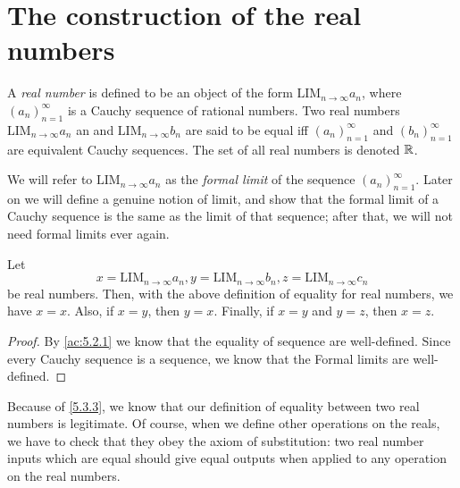 \section{The construction of the real numbers}\label{sec:5.3}

\begin{defn}\label{5.3.1}
  A \emph{real number} is defined to be an object of the form \(\text{LIM}_{n \to \infty} a_n\), where \((a_n)_{n = 1}^{\infty}\) is a Cauchy sequence of rational numbers.
  Two real numbers \(\text{LIM}_{n \to \infty} a_n\) an and \(\text{LIM}_{n \to \infty} b_n\) are said to be equal iff \((a_n)_{n = 1}^{\infty}\) and \((b_n)_{n = 1}^{\infty}\) are equivalent Cauchy sequences.
  The set of all real numbers is denoted \(\mathbb{R}\).
\end{defn}

\begin{note}
  We will refer to \(\text{LIM}_{n \to \infty} a_n\) as the \emph{formal limit} of the sequence \((a_n)_{n = 1}^{\infty}\).
  Later on we will define a genuine notion of limit, and show that the formal limit of a Cauchy sequence is the same as the limit of that sequence;
  after that, we will not need formal limits ever again.
\end{note}

\setcounter{thm}{2}
\begin{prop}\label{5.3.3}
  Let
  \[
    x = \text{LIM}_{n \to \infty} a_n, y = \text{LIM}_{n \to \infty} b_n, z = \text{LIM}_{n \to \infty} c_n
  \]
  be real numbers.
  Then, with the above definition of equality for real numbers, we have \(x = x\).
  Also, if \(x = y\), then \(y = x\).
  Finally, if \(x = y\) and \(y = z\), then \(x = z\).
\end{prop}

\begin{proof}
  By \cref{ac:5.2.1} we know that the equality of sequence are well-defined.
  Since every Cauchy sequence is a sequence, we know that the Formal limits are well-defined.
\end{proof}

\begin{note}
  Because of \cref{5.3.3}, we know that our definition of equality between two real numbers is legitimate.
  Of course, when we define other operations on the reals, we have to check that they obey the axiom of substitution:
  two real number inputs which are equal should give equal outputs when applied to any operation on the real numbers.
\end{note}

